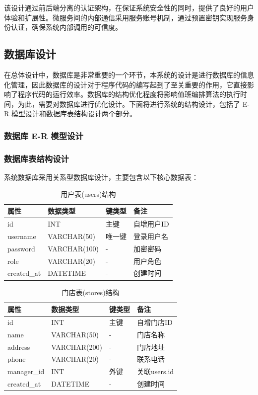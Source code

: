 \documentclass{ctexart}
\begin{document}
该设计通过前后端分离的认证架构，在保证系统安全性的同时，提供了良好的用户体验和扩展性。微服务间的内部通信采用服务账号机制，通过预置密钥实现服务身份认证，确保系统内部调用的可信度。

\subsection{数据库设计}
在总体设计中，数据库是非常重要的一个环节，本系统的设计是进行数据库的信息化管理，因此数据库的设计对于程序代码的编写起到了至关重要的作用，它直接影响了程序代码的运行效率。数据库的结构优化程度将影响值班编排算法的执行时间，为此，需要对数据库进行优化设计。下面将进行系统的结构设计，包括了 E-R 模型设计和数据库表结构设计两个部分。
\subsubsection{数据库 E-R 模型设计}

\subsubsection{数据库表结构设计}
系统数据库采用关系型数据库设计，主要包含以下核心数据表：

\begin{table}[H]
    \centering
    \caption{用户表(users)结构}
    \label{tab:users-table}
    \begin{tabular}{llll}
    \toprule
    属性 & 数据类型 & 键类型 & 备注 \\
    \midrule
    id & INT & 主键 & 自增用户ID \\
    username & VARCHAR(50) & 唯一键 & 登录用户名 \\
    password & VARCHAR(100) & - & 加密密码 \\
    role & VARCHAR(20) & - & 用户角色 \\
    created\_at & DATETIME & - & 创建时间 \\
    \bottomrule
    \end{tabular}
\end{table}

\begin{table}[H]
    \centering
    \caption{门店表(stores)结构}
    \label{tab:stores-table}
    \begin{tabular}{llll}
    \toprule
    属性 & 数据类型 & 键类型 & 备注 \\
    \midrule
    id & INT & 主键 & 自增门店ID \\
    name & VARCHAR(50) & - & 门店名称 \\
    address & VARCHAR(200) & - & 门店地址 \\
    phone & VARCHAR(20) & - & 联系电话 \\
    manager\_id & INT & 外键 & 关联users.id \\
    created\_at & DATETIME & - & 创建时间 \\
    \bottomrule
    \end{tabular}
\end{table}
\end{document}
